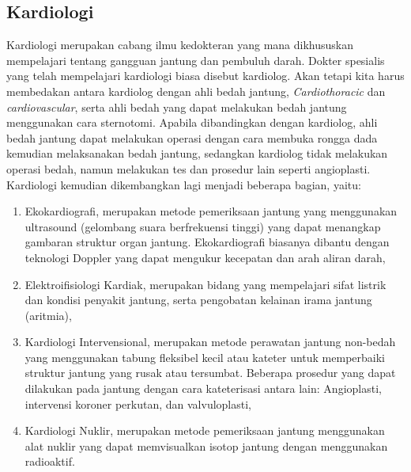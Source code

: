 \subsection{Kardiologi}
\vspace{1ex}
Kardiologi merupakan cabang ilmu kedokteran yang mana dikhususkan mempelajari tentang gangguan jantung dan pembuluh darah. Dokter spesialis yang telah mempelajari kardiologi biasa disebut kardiolog. Akan tetapi kita harus membedakan antara kardiolog dengan ahli bedah jantung, \textit{Cardiothoracic} dan \textit{cardiovascular}, serta ahli bedah yang dapat melakukan bedah jantung menggunakan cara sternotomi. Apabila dibandingkan dengan kardiolog, ahli bedah jantung dapat melakukan operasi dengan cara membuka rongga dada kemudian melaksanakan bedah jantung, sedangkan kardiolog tidak melakukan operasi bedah, namun melakukan tes dan prosedur lain seperti angioplasti.
Kardiologi kemudian dikembangkan lagi menjadi beberapa bagian, yaitu: 
\begin{enumerate}
	\vspace{-2mm}
	\item Ekokardiografi, merupakan metode pemeriksaan jantung yang menggunakan ultrasound (gelombang suara berfrekuensi tinggi) yang dapat menangkap gambaran struktur organ jantung. Ekokardiografi biasanya dibantu dengan teknologi Doppler yang dapat mengukur kecepatan dan arah aliran darah,
	\vspace{-2mm}
	\item Elektroifisiologi Kardiak, merupakan bidang yang mempelajari sifat listrik dan kondisi penyakit jantung, serta pengobatan kelainan irama jantung (aritmia),
	\vspace{-2mm}
	\item Kardiologi Intervensional, merupakan metode perawatan jantung non-bedah yang menggunakan tabung fleksibel kecil atau kateter untuk memperbaiki struktur jantung yang rusak atau tersumbat. Beberapa prosedur yang dapat dilakukan pada jantung dengan cara kateterisasi antara lain: Angioplasti, intervensi koroner perkutan, dan valvuloplasti, 
	\vspace{-2mm}
	\item Kardiologi Nuklir, merupakan metode pemeriksaan jantung menggunakan alat nuklir yang dapat memvisualkan isotop jantung dengan menggunakan radioaktif.
	\vspace{-2mm}
\end{enumerate}
 \vspace{1ex}
 
